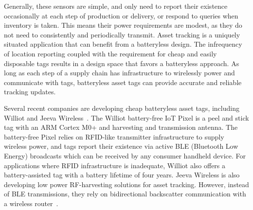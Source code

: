 Generally, these sensors are simple, and only need to report their existence occasionally at each step of production or delivery, or respond to queries when inventory is taken.
This means their power requirements are modest, as
they do not need to consistently and periodically transmit.
Asset tracking is a uniquely situated application that can benefit from a batteryless design.
The infrequency of location reporting coupled with the requirement for cheap and easily disposable tags results in a design space that favors a batteryless approach.
As long as each step of a supply chain has infrastructure to wirelessly power and communicate with tags, batteryless asset tags can provide accurate and reliable tracking updates.

Several recent companies are developing cheap batteryless asset tags, including Williot and Jeeva Wireless~\cite{williotpixel,jeevawireless}.
The Williot battery-free IoT Pixel is a peel and stick tag with an ARM Cortex M0+ and harvesting and transmission antenna.
The battery-free Pixel relies on RFID-like transmitter infrastructure to supply wireless power, and tags report their existence via active BLE (Bluetooth Low Energy) broadcasts which can be received by any consumer handheld device.
For applications where RFID infrastructure is inadequate, Williot also offers a battery-assisted tag with a battery lifetime of four years.
Jeeva Wireless is also developing low power RF-harvesting solutions for asset tracking. However, instead of BLE transmissions, they rely on bidirectional backscatter communication with a wireless router~\cite{jeevawireless}.

